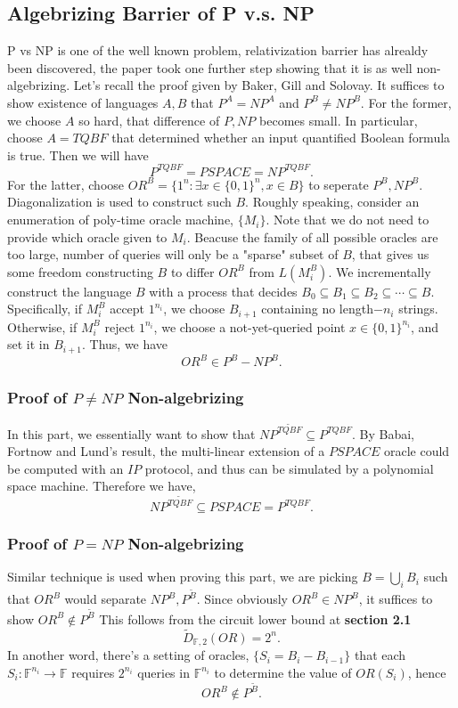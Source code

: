 \documentclass{article}
\begin{document}
\subsection{Algebrizing Barrier of P v.s. NP}
P vs NP is one of the well known problem, relativization barrier has alrealdy been discovered, the paper took one further step showing that it is as well non-algebrizing. Let's recall the proof given by Baker, Gill and Solovay\cite{baker1975relativizations}. It suffices to show existence of languages $A,B$ that $P^A=NP^A$ and $P^B\neq NP^B$. For the former, we choose $A$ so hard, that difference of $P, NP$ becomes small. In particular, choose $A=TQBF$ that determined whether an input quantified Boolean formula is true. Then we will have
$$
P^{TQBF}=PSPACE=NP^{TQBF}.
$$
For the latter, choose $OR^B=\{1^n:\exists x\in\{0,1\}^n,x\in B\}$ to seperate $P^B, NP^B$. Diagonalization is used to construct such $B$. Roughly speaking, consider an enumeration of poly-time oracle machine, $\{M_i\}.$ Note that we do not need to provide which oracle given to $M_i.$ Beacuse the family of all possible oracles are too large, number of queries will only be a "sparse" subset of $B$, that gives us some freedom constructing $B$ to differ $OR^B$ from $L(M_i^B)$. We incrementally construct the language $B$ with a process that decides $B_0\subseteq B_1\subseteq B_2\subseteq\cdots\subseteq B$. Specifically, if $M_i^B$ accept $1^{n_i}$, we choose $B_{i+1}$ containing no length$-n_i$ strings. Otherwise, if $M_i^B$ reject $1^{n_i}$, we choose a not-yet-queried point $x\in\{0,1\}^{n_i}$, and set it in $B_{i+1}$. Thus, we have
$$
OR^B\in P^B-NP^B.
$$

\subsubsection{Proof of $P\neq NP$ Non-algebrizing}
In this part, we essentially want to show that $NP^{\widetilde{TQBF}}\subseteq P^{TQBF}$. By Babai, Fortnow and Lund's result\cite{babai1991non}, the multi-linear extension of a $PSPACE$ oracle could be computed with an $IP$ protocol, and thus can be simulated by a polynomial space machine. Therefore we have,
$$
NP^{\widetilde{TQBF}}\subseteq PSPACE=P^{TQBF}.
$$

\subsubsection{Proof of $P=NP$ Non-algebrizing}
Similar technique is used when proving this part, we are picking $B=\bigcup_i B_i$ such that $OR^B$ would separate $NP^{B}, P^{\tilde{B}}$. Since obviously $OR^B\in NP^B$, it suffices to show $OR^B\not\in P^{\tilde{B}}$ This follows from the circuit lower bound at {\bf section 2.1}
$$
\tilde{D}_{\mathbb{F},2}(OR)=2^n.
$$
In another word, there's a setting of oracles, $\{S_i=B_i-B_{i-1}\}$ that each $S_i:\mathbb{F}^{n_i}\rightarrow \mathbb{F}$ requires $2^{n_i}$ queries in $\mathbb{F}^{n_i}$ to determine the value of $OR(S_i)$, hence
$$
OR^B\not\in P^\tilde{B}.
$$
\end{document}
